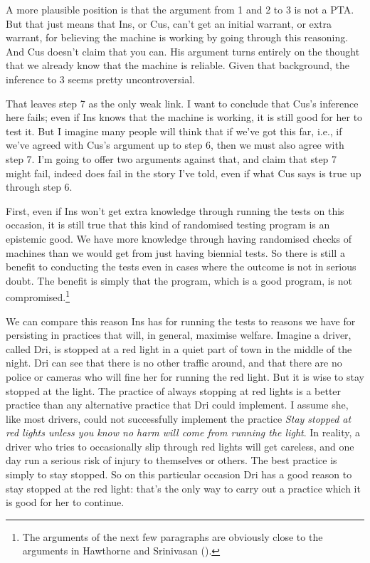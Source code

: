 \documentclass[
  10pt,
  letterpaper,
  twoside]{scrbook}
\begin{document}
A more plausible position is that the argument from 1 and 2 to 3 is not
a PTA. But that just means that {Ins}, or {Cus}, can't get an initial
warrant, or extra warrant, for believing the machine is working by going
through this reasoning. And {Cus} doesn't claim that you can. His
argument turns entirely on the thought that we already know that the
machine is reliable. Given that background, the inference to 3 seems
pretty uncontroversial.

That leaves step 7 as the only weak link. I want to conclude that
{Cus}'s inference here fails; even if {Ins} knows that the machine is
working, it is still good for her to test it. But I imagine many people
will think that if we've got this far, i.e., if we've agreed with
{Cus}'s argument up to step 6, then we must also agree with step 7. I'm
going to offer two arguments against that, and claim that step 7 might
fail, indeed does fail in the story I've told, even if what {Cus} says
is true up through step 6.

First, even if {Ins} won't get extra knowledge through running the tests
on this occasion, it is still true that this kind of randomised testing
program is an epistemic good. We have more knowledge through having
randomised checks of machines than we would get from just having
biennial tests. So there is still a benefit to conducting the tests even
in cases where the outcome is not in serious doubt. The benefit is
simply that the program, which is a good program, is not
compromised.\footnote{The arguments of the next few paragraphs are
  obviously close to the arguments in Hawthorne and Srinivasan
  ().}

We can compare this reason {Ins} has for running the tests to reasons we
have for persisting in practices that will, in general, maximise
welfare. Imagine a driver, called {Dri}, is stopped at a red light in a
quiet part of town in the middle of the night. {Dri} can see that there
is no other traffic around, and that there are no police or cameras who
will fine her for running the red light. But it is wise to stay stopped
at the light. The practice of always stopping at red lights is a better
practice than any alternative practice that {Dri} could implement. I
assume she, like most drivers, could not successfully implement the
practice \emph{Stay stopped at red lights unless you know no harm will
come from running the light}. In reality, a driver who tries to
occasionally slip through red lights will get careless, and one day run
a serious risk of injury to themselves or others. The best practice is
simply to stay stopped. So on this particular occasion {Dri} has a good
reason to stay stopped at the red light: that's the only way to carry
out a practice which it is good for her to continue.
\end{document}
